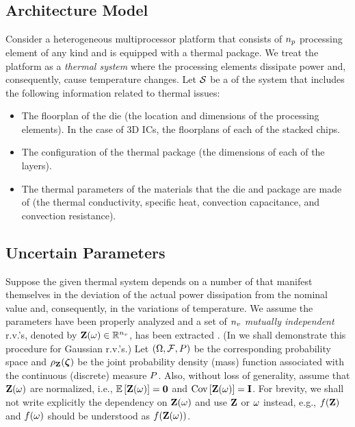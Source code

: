 \subsection{Architecture Model} 
Consider a heterogeneous multiprocessor platform that consists of ${n_p}$ processing element of any kind and is equipped with a thermal package. We treat the platform as a \emph{thermal system} where the processing elements dissipate power and, consequently, cause temperature changes. Let $\mathcal{S}$ be a  of the system that includes the following information related to thermal issues:
\begin{itemize}
  \item The floorplan of the die (the location and dimensions of the processing elements). In the case of 3D ICs, the floorplans of each of the stacked chips.
  \item The configuration of the thermal package (the dimensions of each of the layers).
  \item The thermal parameters of the materials that the die and package are made of (the thermal conductivity, specific heat, convection capacitance, and convection resistance).
\end{itemize}

\subsection{Uncertain Parameters} 
Suppose the given thermal system depends on a number of  that manifest themselves in the deviation of the actual power dissipation from the nominal value and, consequently, in the variations of temperature. We assume the parameters have been properly analyzed and a set of ${n_v}$ \emph{mutually independent} r.v.'s, denoted by $\mathbf{Z}(\omega) \in \mathbb{R}^{n_v}$, has been extracted \cite{xiu2010}. (In  we shall demonstrate this procedure for Gaussian r.v.'s.) Let $(\Omega, \mathcal{F}, P)$ be the corresponding probability space and $\rho_{\mathbf{Z}}(\boldsymbol{\zeta})$ be the joint probability density (mass) function associated with the continuous (discrete) measure $P$. Also, without loss of generality, assume that $\mathbf{Z}(\omega)$ are normalized, i.e., $\oExp{\vZ(\o)} = \mZero$ and $\oCov{\vZ(\o)} = \mI$. For brevity, we shall not write explicitly the dependency on $\mathbf{Z}(\omega)$ and use $\mathbf{Z}$ or $\omega$ instead, e.g., $f(\mathbf{Z})$ and $f(\omega)$ should be understood as $f(\mathbf{Z}(\omega))$.

